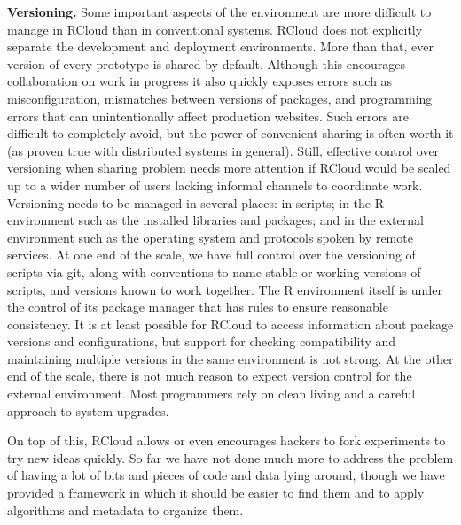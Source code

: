 {\bf Versioning.}
Some important aspects of the environment are more difficult to manage
in RCloud than in conventional systems. RCloud does not explicitly
separate the development and deployment environments. More than that,
ever version of every prototype is shared by default. Although this encourages
collaboration on work in progress it also quickly exposes errors such as
misconfiguration, mismatches between versions of packages, and programming
errors that can unintentionally affect production websites. Such errors
are difficult to completely avoid, but the power of convenient sharing is often
worth it (as proven true with distributed systems in general).
Still, effective control over versioning when sharing problem needs more
attention if RCloud would be scaled up to a wider number of users lacking
informal channels to coordinate work.
Versioning needs to be managed in several places: in scripts;
in the R environment such as the installed libraries and packages;
and in the external environment such as the operating system and
protocols spoken by remote services. At one end of the scale, we have
full control over the versioning of scripts via git, along with conventions
to name stable or working versions of scripts, and versions known to work together.
The R environment itself is under the control of its package manager
that has rules to ensure reasonable consistency.
It is at least possible for RCloud to access information about
package versions and configurations, but support for checking compatibility
and maintaining multiple versions in the same environment is not strong.
At the other end of the scale, there is not much reason to expect version
control for the external environment. Most programmers rely on clean living
and a careful approach to system upgrades.

On top of this, RCloud allows or even encourages hackers to fork experiments
to try new ideas quickly. So far we have not done much more to address the
problem of having a lot of bits and pieces of code and data lying around,
though we have provided a framework in which it should be easier to find them
and to apply algorithms and metadata to organize them.


